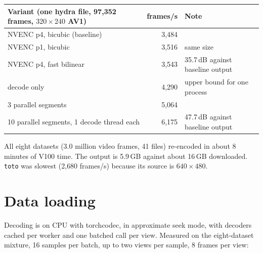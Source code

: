 \documentclass[10pt]{article}
\newcommand{\code}[1]{\texttt{\small #1}}
\begin{document}
\begin{center}\small
\begin{tabular}{@{}lrl@{}}
\toprule
Variant (one hydra file, 97{,}352 frames, $320{\times}240$ AV1) & frames/s & Note \\
\midrule
NVENC p4, bicubic (baseline) & 3{,}484 & \\
NVENC p1, bicubic & 3{,}516 & same size \\
NVENC p4, fast bilinear & 3{,}543 & 35.7\,dB against baseline output \\
decode only & 4{,}290 & upper bound for one process \\
3 parallel segments & 5{,}064 & \\
10 parallel segments, 1 decode thread each & 6{,}175 & 47.7\,dB against baseline output \\
\bottomrule
\end{tabular}
\end{center}

All eight datasets (3.0 million video frames, 41 files) re-encoded in about 8 minutes of V100
time. The output is 5.9\,GB against about 16\,GB downloaded. \code{toto} was slowest
(2{,}680 frames/s) because its source is $640{\times}480$.

\section{Data loading}
Decoding is on CPU with torchcodec, in approximate seek mode, with decoders cached per
worker and one batched call per view. Measured on the eight-dataset mixture, 16 samples per
batch, up to two views per sample, 8 frames per view:
\end{document}
